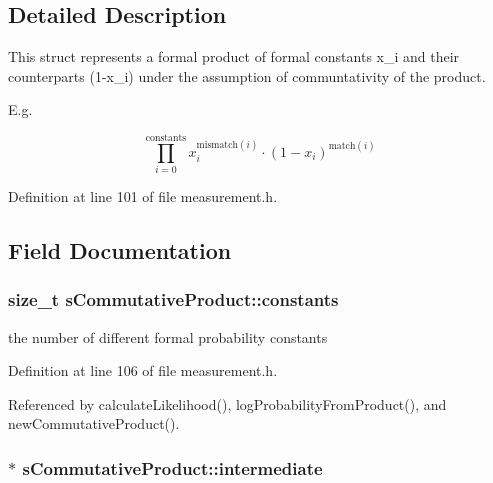 \subsection{\-Detailed \-Description}
\-This struct represents a formal product of formal constants x\-\_\-i and their counterparts (1-\/x\-\_\-i) under the assumption of communtativity of the product. 

\-E.\-g.

\[ \prod_{i=0}^{\mathrm{constants}} x_i^{\mathrm{mismatch}(i)} \cdot (1-x_i)^{\mathrm{match}(i)} \] 

\-Definition at line 101 of file measurement.\-h.



\subsection{\-Field \-Documentation}
\hypertarget{structsCommutativeProduct_af77351b19630473b2fedc9267665032a}{
\subsubsection[{constants}]{\setlength{\rightskip}{0pt plus 5cm}size\-\_\-t {\bf s\-Commutative\-Product\-::constants}}}\label{structsCommutativeProduct_af77351b19630473b2fedc9267665032a}


the number of different formal probability constants 



\-Definition at line 106 of file measurement.\-h.



\-Referenced by calculate\-Likelihood(), log\-Probability\-From\-Product(), and new\-Commutative\-Product().

\hypertarget{structsCommutativeProduct_a62301df4ed7d412fb3e45fc7f8d6b0f3}{
\subsubsection[{intermediate}]{$\ast$ {\bf s\-Commutative\-Product\-::intermediate}}}\label{structsCommutativeProduct_a62301df4ed7d412fb3e45fc7f8d6b0f3}


